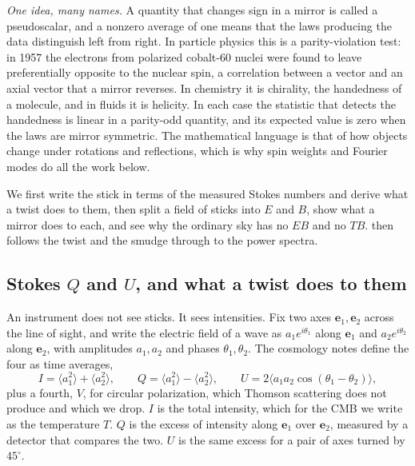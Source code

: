 \emph{One idea, many names.} A quantity that changes sign in a mirror is called a pseudoscalar, and a nonzero average of one means that the laws producing the data distinguish left from right. In particle physics this is a parity-violation test: in 1957 the electrons from polarized cobalt-60 nuclei were found to leave preferentially opposite to the nuclear spin, a correlation between a vector and an axial vector that a mirror reverses. In chemistry it is chirality, the handedness of a molecule, and in fluids it is helicity. In each case the statistic that detects the handedness is linear in a parity-odd quantity, and its expected value is zero when the laws are mirror symmetric. The mathematical language is that of how objects change under rotations and reflections, which is why spin weights and Fourier modes do all the work below.

We first write the stick in terms of the measured Stokes numbers and derive what a twist does to them, then split a field of sticks into $E$ and $B$, show what a mirror does to each, and see why the ordinary sky has no $EB$ and no $TB$.  then follows the twist and the smudge through to the power spectra.

\subsection{Stokes \texorpdfstring{$Q$}{Q} and \texorpdfstring{$U$}{U}, and what a twist does to them}
\label{T1c:sec:stokes}

An instrument does not see sticks. It sees intensities. Fix two axes $\bm e_1,\bm e_2$ across the line of sight, and write the electric field of a wave as $a_1e^{i\theta_1}$ along $\bm e_1$ and $a_2e^{i\theta_2}$ along $\bm e_2$, with amplitudes $a_1,a_2$ and phases $\theta_1,\theta_2$. The cosmology notes define the four  as time averages,
\begin{equation}
I=\langle a_1^2\rangle+\langle a_2^2\rangle,\qquad
Q=\langle a_1^2\rangle-\langle a_2^2\rangle,\qquad
U=2\langle a_1a_2\cos(\theta_1-\theta_2)\rangle,
\label{T1c:eq:stokes}
\end{equation}
plus a fourth, $V$, for circular polarization, which Thomson scattering does not produce and which we drop. $I$ is the total intensity, which for the CMB we write as the temperature $T$. $Q$ is the excess of intensity along $\bm e_1$ over $\bm e_2$, measured by a detector that compares the two. $U$ is the same excess for a pair of axes turned by $45^\circ$.

